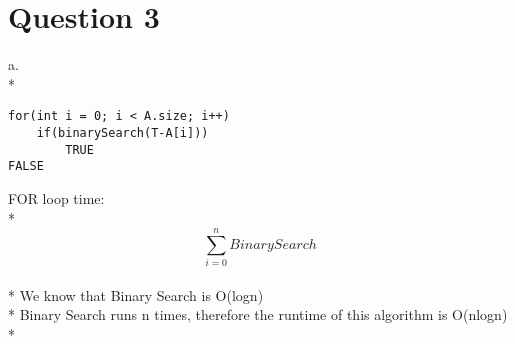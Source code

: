 \documentclass[11pt]{article}
\newcommand\tab[1][1cm]{\hspace*{#1}}
\begin{document}
\section*{Question 3}
a.\\*
\begin{lstlisting}
for(int i = 0; i < A.size; i++)
	if(binarySearch(T-A[i]))
		TRUE
FALSE
\end{lstlisting}

\tab FOR loop time:\\*
\tab $$\sum_{i=0}^{n}Binary Search$$\\*
\tab We know that Binary Search is O(logn)\\*
\tab Binary Search runs n times, therefore the
runtime of this algorithm is O(nlogn)\\*
\end{document}
